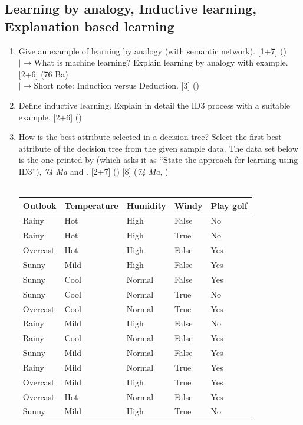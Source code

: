 \documentclass[12pt]{article}
\newcommand{\lb}{\\$\left|\rightarrow\right.$}
\newcommand{\enter}{\\\textcolor{white}{1}}
\begin{document}
  \subsection{Learning by analogy, Inductive learning, Explanation based learning}
    \begin{enumerate}[topsep=0pt, noitemsep]
      \item Give an example of learning by analogy (with semantic network). \hfill [1+7] ()
        \lb What is machine learning? Explain learning by analogy with example. \hfill [2+6] (76 Ba)
        \lb Short note: Induction versus Deduction. \hfill [3] ()

      \item Define inductive learning. Explain in detail the ID3 process with a suitable example. \hfill [2+6] ()

      \item How is the best attribute selected in a decision tree? Select the first best attribute of the decision tree from the given sample data. The data set below is the one printed by  (which asks it as ``State the approach for learning using ID3''), \textit{74 Ma} and . \hfill [2+7] () [8] (\textit{74 Ma}, )
        \enter
        \begin{tabular}{|l|l|l|l|l|}
          \hline
          Outlook & Temperature & Humidity & Windy & Play golf \\ \hline
          Rainy & Hot & High & False & No \\
          Rainy & Hot & High & True & No \\
          Overcast & Hot & High & False & Yes \\
          Sunny & Mild & High & False & Yes \\
          Sunny & Cool & Normal & False & Yes \\
          Sunny & Cool & Normal & True & No \\
          Overcast & Cool & Normal & True & Yes \\
          Rainy & Mild & High & False & No \\
          Rainy & Cool & Normal & False & Yes \\
          Sunny & Mild & Normal & False & Yes \\
          Rainy & Mild & Normal & True & Yes \\
          Overcast & Mild & High & True & Yes \\
          Overcast & Hot & Normal & False & Yes \\
          Sunny & Mild & High & True & No \\ \hline
        \end{tabular}


\end{enumerate}
\end{document}
